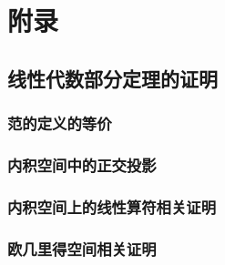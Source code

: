 \documentclass[zihao=-4,linespread=1.5,a4paper,heading=true,twoside]{ctexbook}
\theoremstyle{definition}
\theoremstyle{plain}
\begin{document}


\appendix
\newpage\part{附录}
\chapter{线性代数部分定理的证明}\label{sec:A}
\section{范的定义的等价}\label{sec:A.1}


\section{内积空间中的正交投影}\label{sec:A.2}


\section{内积空间上的线性算符相关证明}\label{sec:A.3}


\section{欧几里得空间相关证明}\label{sec:A.4}

\end{document}
